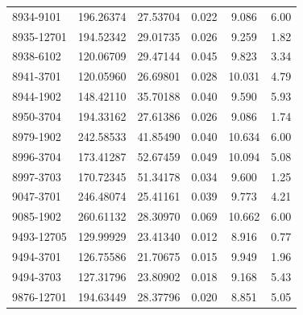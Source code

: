 \begin{table}[h]
\begin{tabular}{lccccc}
8934-9101 & 196.26374 & 27.53704 & 0.022 & 9.086 & 6.00 \\
8935-12701 & 194.52342 & 29.01735 & 0.026 & 9.259 & 1.82 \\
8938-6102 & 120.06709 & 29.47144 & 0.045 & 9.823 & 3.34 \\
8941-3701 & 120.05960 & 26.69801 & 0.028 & 10.031 & 4.79 \\
8944-1902 & 148.42110 & 35.70188 & 0.040 & 9.590 & 5.93 \\
8950-3704 & 194.33162 & 27.61386 & 0.026 & 9.086 & 1.74 \\
8979-1902 & 242.58533 & 41.85490 & 0.040 & 10.634 & 6.00 \\
8996-3704 & 173.41287 & 52.67459 & 0.049 & 10.094 & 5.08 \\
8997-3703 & 170.72345 & 51.34178 & 0.034 & 9.600 & 1.25 \\
9047-3701 & 246.48074 & 25.41161 & 0.039 & 9.773 & 4.21 \\
9085-1902 & 260.61132 & 28.30970 & 0.069 & 10.662 & 6.00 \\
9493-12705 & 129.99929 & 23.41340 & 0.012 & 8.916 & 0.77 \\
9494-3701 & 126.75586 & 21.70675 & 0.015 & 9.949 & 1.96 \\
9494-3703 & 127.31796 & 23.80902 & 0.018 & 9.168 & 5.43 \\
9876-12701 & 194.63449 & 28.37796 & 0.020 & 8.851 & 5.05 \\
\hline
\end{tabular}
\end{table}


